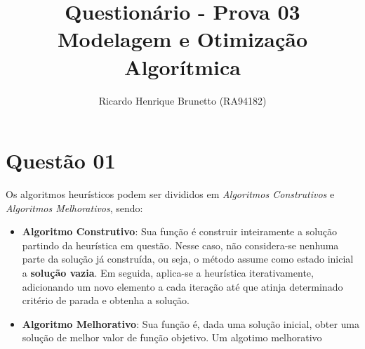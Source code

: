 

\sloppy

\title{Questionário - Prova 03\\Modelagem e Otimização Algorítmica}

\author{Ricardo Henrique Brunetto (RA94182)}


\address{Departamento de Informática -- Universidade Estadual de Maringá (UEM)\\
	Maringá -- PR -- Brasil
}



	\maketitle

	{\resumo{}}

  \section*{Questão 01}
	Os algoritmos heurísticos podem ser divididos em \textit{Algoritmos Construtivos} e \textit{Algoritmos Melhorativos},
	sendo:
	\begin{itemize}
		\item \textbf{Algoritmo Construtivo}: Sua função é construir inteiramente a solução
		partindo da heurística em questão. Nesse caso, não considera-se nenhuma parte da solução
		já construída, ou seja, o método assume como estado inicial a \textbf{solução vazia}.
		Em seguida, aplica-se a heurística iterativamente, adicionando um novo elemento a
		cada iteração até que atinja determinado critério de parada e obtenha a solução.

		\item \textbf{Algoritmo Melhorativo}: Sua função é, dada uma solução inicial,
		obter uma solução de melhor valor de função objetivo. Um algotimo melhorativo
	\end{itemize}

	
	



